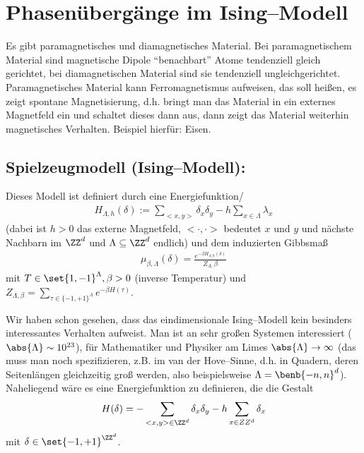 
\section{Phasenübergänge im Ising--Modell}

Es gibt paramagnetisches und diamagnetisches Material. Bei paramagnetischem Material sind magnetische Dipole \enquote{benachbart} Atome  tendenziell gleich gerichtet, bei diamagnetischen Material sind sie tendenziell ungleichgerichtet. Paramagnetisches Material kann Ferromagnetismus aufweisen, das soll heißen, es zeigt spontane Magnetisierung, d.h. bringt man das Material in ein externes Magnetfeld ein und schaltet dieses dann aus, dann zeigt das Material weiterhin magnetisches Verhalten. Beispiel hierfür: Eisen.
\subsection*{Spielzeugmodell (Ising--Modell):}
Dieses Modell ist definiert durch eine Energiefunktion/
\begin{align}
	H_{\Lambda,h} (\delta) := \sum\limits_{<x,y>} \delta_x \delta_y - h \sum\limits_{x \in \Lambda} \lambda_x
\end{align}
(dabei ist $h>0$ das externe Magnetfeld, $<\cdot,\cdot>$ bedeutet $x$ und $y$ und nächste Nachbarn im $\ZZ^d$ und $\Lambda \subseteq \ZZ^d$ endlich) und dem induzierten Gibbsmaß 
\begin{align}
	\mu_{\beta,\Lambda}(\delta) = \frac{e^{-\beta H_{\Lambda,h}(\delta)}}{Z_{\Lambda,}\beta}
\end{align}
mit $T \in \set{1,-1}^{\Lambda}, \beta > 0$ (inverse Temperatur) und $Z_{\Lambda, \beta} = \sum\limits_{\tau \in \{-1,+1\}^{\Lambda}}e^{-\beta H(\tau)}$.

Wir haben schon gesehen, dass das eindimensionale Ising--Modell kein besinders interessantes Verhalten aufweist. Man ist an sehr großen Systemen interessiert ($\abs{\Lambda} \sim 10^{23}$), für Mathematiker und Physiker am Limes $\abs{\Lambda} \to \infty$ (das muss man noch spezifizieren, z.B. im van der Hove--Sinne, d.h. in Quadern, deren Seitenlängen gleichzeitig groß werden, also beispielsweise $\Lambda = \benb{-n,n}^d$). Naheliegend wäre es eine Energiefunktion zu definieren, die die Gestalt 
\begin{align}
	H(\delta) = - \sum\limits_{<x,y> \in \ZZ^d} \delta_x \delta_y - h \sum\limits_{x \in ZZ^d} \delta_x
\end{align}
mit $\delta \in \set{-1,+1}^{\ZZ^d}$.

